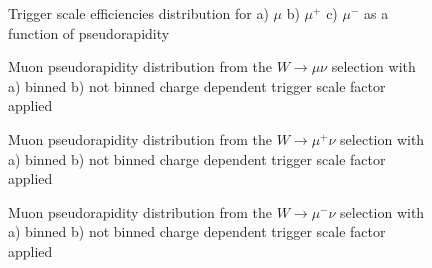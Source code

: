 \begin{figure}[!b]
\endminipage\hfill
{}
\endminipage\hfill
{}%
\endminipage
\caption{Trigger scale efficiencies distribution for a) $\mu$ b) $\mu^{+}$  c) $\mu^{-}$ as a function of pseudorapidity}
\label{fig:MuSF}
\end{figure}

\begin{figure}[!tbp]
\endminipage\hfill
{}
\endminipage\hfill
\caption{Muon pseudorapidity distribution from the $W\to \mu \nu$ selection with a) binned  b) not binned charge dependent trigger scale factor applied}
\label{fig:SFBined1}
\end{figure}

\begin{figure}[!tbp]
\endminipage\hfill
{}
\endminipage\hfill
\caption{Muon pseudorapidity distribution from the $W\to \mu^+ \nu$ selection with a) binned  b) not binned charge dependent trigger scale factor applied}
\label{fig:SFBined2}
\end{figure}

\begin{figure}[!tbp]
\endminipage\hfill
{}
\endminipage\hfill
\caption{Muon pseudorapidity distribution from the $W\to \mu^- \nu$ selection with a) binned  b) not binned charge dependent trigger scale factor applied}
\label{fig:SFBined3}
\end{figure}

